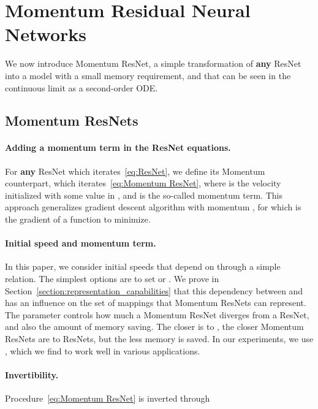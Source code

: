 \documentclass{article}
\begin{document}
\section{Momentum Residual Neural Networks}\label{section:mom_net}
We now introduce Momentum ResNet, a simple transformation of \textbf{any} ResNet into a model with a small memory requirement, and that can be seen in the continuous limit as a second-order ODE.
\vspace{-1em}
\subsection{Momentum ResNets}\label{section:Momentum_nets}

\paragraph{Adding a momentum term in the ResNet equations.}

For \textbf{any} ResNet which iterates~\eqref{eq:ResNet},
we define its Momentum counterpart, which iterates~\eqref{eq:Momentum ResNet},
where  is the velocity  initialized with some value  in , and  is the so-called momentum term. This approach generalizes gradient descent algorithm with momentum \citep{ruder2016overview},
for which  is the gradient of a function to minimize. 

\paragraph{Initial speed and momentum term.}

 In this paper, we consider initial speeds  that depend on  through a simple relation. The simplest options are to set  or . We prove in Section~\ref{section:representation_capabilities} that this dependency between  and  has an influence on the set of mappings that Momentum ResNets can represent.
The parameter  controls how much a Momentum ResNet diverges from a ResNet, and also the amount of memory saving. The closer  is to , the closer Momentum ResNets are to ResNets, but the less memory is saved. In our experiments, we use , which we find to work well in various applications.

\paragraph{Invertibility.}

Procedure~\eqref{eq:Momentum ResNet} is inverted through
\end{document}
